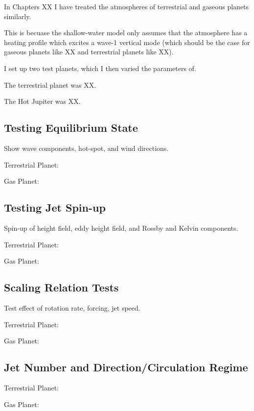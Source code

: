 In Chapters XX I have treated the atmospheres of terrestrial and gaseous planets similarly.

This is becuase the shallow-water model only assumes that the atmosphere has a heating profile which excites a wave-1 vertical mode (which should be the case for gaseous planets like XX and terrestrial planets like XX).

I set up two test planets, which I then varied the parameters of.

The terrestrial planet was XX.

The Hot Jupiter was XX.

\subsection*{Testing Equilibrium State}

Show wave components, hot-spot, and wind directions.

Terrestrial Planet:

Gas Planet:

\subsection*{Testing Jet Spin-up}

Spin-up of height field, eddy height field, and Rossby and Kelvin components.

Terrestrial Planet:

Gas Planet:

\subsection*{Scaling Relation Tests}

Test effect of rotation rate, forcing, jet speed.

Terrestrial Planet:

Gas Planet:

\subsection*{Jet Number and Direction/Circulation Regime}

Terrestrial Planet:

Gas Planet:









% 
% 

